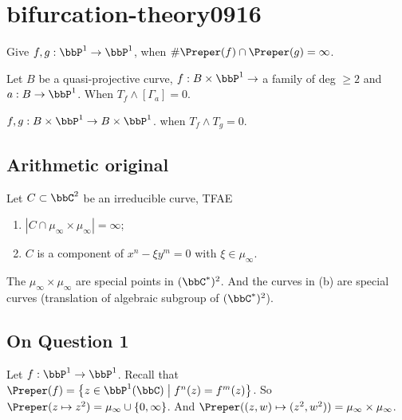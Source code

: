 \section{bifurcation-theory0916}

\begin{question}[label=\labelNFM{ques:1}, status=draft, tag=0000000]
	Give $f,g: \bbP^1 \to \bbP^1$, when $\# \Preper(f) \cap \Preper(g) = \infty$.
\end{question}


\begin{question}[label=\labelNFM{ques:2.1}, status=draft, tag=0000000]
	Let $B$ be a quasi-projective curve, $f:B \times \bbP^1 \to $ a family of deg $\geq 2$ and $a: B \to \bbP^1$.
	When $T_f \wedge [\Gamma_a] = 0$.
\end{question}

\begin{question}[label=\labelNFM{ques:3}, status=draft, tag=0000000]
	$f,g: B \times \bbP^1 \to B \times \bbP^1$. when $T_f \wedge T_g = 0$.
\end{question}

\subsection[status=draft,tag=0000000,label=\labelNFM{subsec:ari}]{Arithmetic original}

\begin{theorem}[label=\labelNFM{thm:lang}, status=draft, tag=0000000]
	Let $C \subset \bbC^2$ be an irreducible curve, TFAE
	\begin{enumerate}
		\item $|C \cap \mu_\infty \times \mu_\infty| = \infty$;
		\item $C$ is a component of $x^n - \xi y^m = 0$ with $\xi \in \mu_\infty$.
	\end{enumerate}
\end{theorem}

The $\mu_\infty \times \mu_\infty$ are special points in $(\bbC^*)^2$.
And the curves in (b) are special curves (translation of algebraic subgroup of $(\bbC^*)^2$).


\subsection[status=draft,tag=0000000,label=\labelNFM{subsec:q1}]{On Question 1}

Let $f: \bbP^1 \to \bbP^1$.
Recall that $\Preper(f) = \left\{ z \in \bbP^1(\bbC) \;\middle|\; f^n(z) = f^m(z) \right\} $.
So $\Preper(z \mapsto z^2) = \mu_\infty \cup \{0,\infty\}$.
And $\Preper((z,w) \mapsto (z^2,w^2)) = \mu_\infty \times \mu_\infty$.

